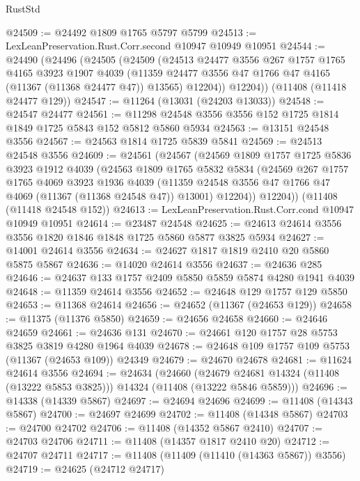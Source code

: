 \begin{lexlean}{RustStd}
\begin{coremodule}
@24509 := @24492 @1809 @1765 @5797 @5799
@24513 := LexLeanPreservation.Rust.Corr.second @10947 @10949 @10951
@24544 := @24490
    (@24496
      (@24505
        (@24509
          (@24513
            @24477
            @3556
            @267
            @1757
            @1765
            @4165
            @3923
            @1907
            @4039
            (@11359 @24477 @3556 @47 @1766 @47 @4165 (@11367 (@11368 @24477 @47)) @13565)
            @12204))
        @12204))
    (@11408 (@11418 @24477 @129))
@24547 := @11264 (@13031 (@24203 @13033))
@24548 := @24547 @24477
@24561 := @11298 @24548 @3556 @3556 @152 @1725 @1814 @1849 @1725 @5843 @152 @5812 @5860 @5934
@24563 := @13151 @24548 @3556
@24567 := @24563 @1814 @1725 @5839 @5841
@24569 := @24513 @24548 @3556
@24609 := @24561
    (@24567
      (@24569
        @1809
        @1757
        @1725
        @5836
        @3923
        @1912
        @4039
        (@24563
          @1809
          @1765
          @5832
          @5834
          (@24569
            @267
            @1757
            @1765
            @4069
            @3923
            @1936
            @4039
            (@11359 @24548 @3556 @47 @1766 @47 @4069 (@11367 (@11368 @24548 @47)) @13001)
            @12204))
        @12204))
    (@11408 (@11418 @24548 @152))
@24613 := LexLeanPreservation.Rust.Corr.cond @10947 @10949 @10951
@24614 := @23487 @24548
@24625 := @24613 @24614 @3556 @3556 @1820 @1846 @1848 @1725 @5860 @5877 @3825 @5934
@24627 := @14001 @24614 @3556
@24634 := @24627 @1817 @1819 @2410 @20 @5860 @5875 @5867
@24636 := @14020 @24614 @3556
@24637 := @24636 @285
@24646 := @24637 @133 @1757 @2409 @5850 @5859 @5874 @4280 @1941 @4039
@24648 := @11359 @24614 @3556
@24652 := @24648 @129 @1757 @129 @5850
@24653 := @11368 @24614
@24656 := @24652 (@11367 (@24653 @129))
@24658 := @11375 (@11376 @5850)
@24659 := @24656 @24658
@24660 := @24646 @24659
@24661 := @24636 @131
@24670 := @24661 @120 @1757 @28 @5753 @3825 @3819 @4280 @1964 @4039
@24678 := @24648 @109 @1757 @109 @5753 (@11367 (@24653 @109)) @24349
@24679 := @24670 @24678
@24681 := @11624 @24614 @3556
@24694 := @24634
    (@24660
      (@24679 @24681 @14324 (@11408 (@13222 @5853 @3825)))
      @14324
      (@11408 (@13222 @5846 @5859)))
@24696 := @14338 (@14339 @5867)
@24697 := @24694 @24696
@24699 := @11408 (@14343 @5867)
@24700 := @24697 @24699
@24702 := @11408 (@14348 @5867)
@24703 := @24700 @24702
@24706 := @11408 (@14352 @5867 @2410)
@24707 := @24703 @24706
@24711 := @11408 (@14357 @1817 @2410 @20)
@24712 := @24707 @24711
@24717 := @11408 (@11409 (@11410 (@14363 @5867)) @3556)
@24719 := @24625 (@24712 @24717)

\end{coremodule}
\end{lexlean}

